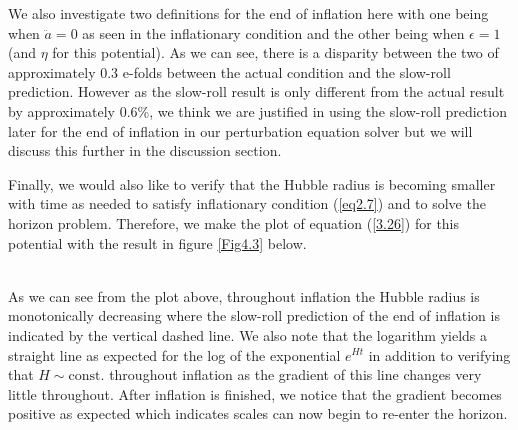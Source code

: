 \documentclass[a4paper,12pt,twoside]{report}
\begin{document}
We also investigate two definitions for the end of inflation here with one being when $\ddot{a} = 0$ as seen in the inflationary condition and the other being when $\epsilon = 1$ (and $\eta$ for this potential). As we can see, there is a disparity between the two of approximately 0.3 e-folds between the actual condition and the slow-roll prediction. However as the slow-roll result is only different from the actual result by approximately 0.6\%, we think we are justified in using the slow-roll prediction later for the end of inflation in our perturbation equation solver but we will discuss this further in the discussion section.

Finally, we would also like to verify that the Hubble radius is becoming smaller with time as needed to satisfy inflationary condition (\ref{eq2.7}) and to solve the horizon problem. Therefore, we make the plot of equation (\ref{3.26}) for this potential with the result in figure \ref{Fig4.3} below.

\noindent%
\begin{minipage}{\linewidth}%
\label{Fig4.3}
\end{minipage}
\\[10pt]

As we can see from the plot above, throughout inflation the Hubble radius is monotonically decreasing where the slow-roll prediction of the end of inflation is indicated by the vertical dashed line. We also note that the logarithm yields a straight line as expected for the log of the exponential $e^{Ht}$ in addition to verifying that $H \sim \mathrm{const.}$ throughout inflation as the gradient of this line changes very little throughout. After inflation is finished, we notice that the gradient becomes positive as expected which indicates scales can now begin to re-enter the horizon.
\end{document}
